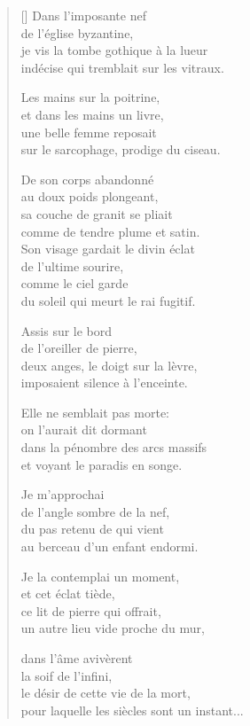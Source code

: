 \documentclass[a4paper,12pt]{book}
\begin{document}
\begin{verse}[\versewidth]
  Dans l'imposante nef \\
  de l'église byzantine, \\
  je vis la tombe gothique à la lueur \\
  indécise qui tremblait sur les vitraux.

  Les mains sur la poitrine, \\
  et dans les mains un livre, \\
  une belle femme reposait \\
  sur le sarcophage, prodige du ciseau.

  De son corps abandonné \\
  au doux poids plongeant, \\
  sa couche de granit se pliait \\
  comme de tendre plume et satin. \\

  Son visage gardait le divin éclat \\
  de l'ultime sourire, \\
  comme le ciel garde \\
  du soleil qui meurt le rai fugitif.

  Assis sur le bord \\
  de l'oreiller de pierre, \\
  deux anges, le doigt sur la lèvre, \\
  imposaient silence à l'enceinte.

  Elle ne semblait pas morte: \\
  on l'aurait dit dormant \\
  dans la pénombre des arcs massifs \\
  et voyant le paradis en songe.

  Je m'approchai \\
  de l'angle sombre de la nef, \\
  du pas retenu de qui vient \\
  au berceau d'un enfant endormi.

  Je la contemplai un moment, \\
  et cet éclat tiède, \\
  ce lit de pierre qui offrait, \\
  un autre lieu vide proche du mur,

  dans l'âme avivèrent \\
  la soif de l'infini, \\
  le désir de cette vie de la mort, \\
  pour laquelle les siècles sont un instant...


\end{verse}
\end{document}
